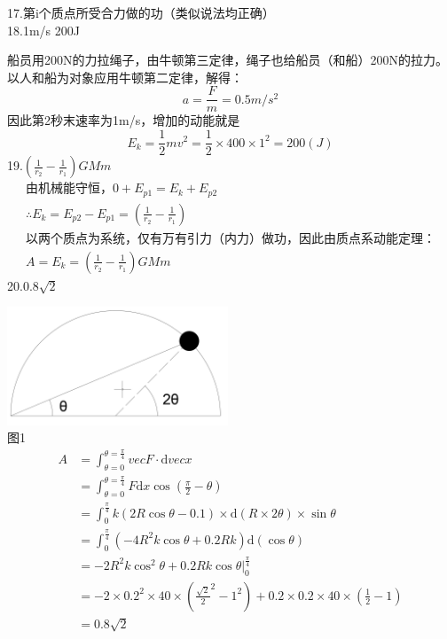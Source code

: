 \documentclass[b5paper,opensource]{./template/qyxf-book}
\newcommand{\di}[1]{\mathrm{d}#1}
\begin{document}
17.第i个质点所受合力做的功（类似说法均正确）\\
18.1m/s \qquad 200J\par
船员用200N的力拉绳子，由牛顿第三定律，绳子也给船员（和船）200N的拉力。以人和船为对象应用牛顿第二定律，解得：
\[a=\frac{F}{m}=0.5m/s^2\]
因此第2秒末速率为1m/s，增加的动能就是
\[E_k=\frac{1}{2}mv^2=\frac{1}{2}\times400\times1^2=200(J)\]
19.$\left(\frac{1}{r_2}-\frac{1}{r_1}\right)GMm$ 
\begin{gather*}
\text{由机械能守恒，}0+E_{p1}=E_k+E_{p2}\\
\therefore E_k=E_{p2}-E_{p1}=\left(\frac{1}{r_2}-\frac{1}{r_1}\right)\\
\text{以两个质点为系统，仅有万有引力（内力）做功，因此由质点系动能定理：}\\
A=E_k=\left(\frac{1}{r_2}-\frac{1}{r_1}\right)GMm
\end{gather*}
20.$0.8\sqrt{2}$\par
\centering\includegraphics[height=100pt]{Chp2_illus1.png}\\
图1
\begin{align*}
A	&=\int_{\theta=0}^{\theta=\frac{\pi}{4}}{vec{F}}\cdot\di{vec{x}}\\
&=\int_{\theta=0}^{\theta=\frac{\pi}{4}}F\di{x}\cos\left(\frac{\pi}{2}-\theta\right)\\
&=\int_{0}^{\frac{\pi}{4}}k(2R\cos\theta-0.1)\times\di{(R\times 2\theta)}\times\sin\theta\\
&=\int_{0}^{\frac{\pi}{4}}(-4R^2k\cos\theta+0.2Rk)\di{(\cos\theta)}\\
&=-2R^2k\cos^2\theta+0.2Rk\cos\theta\left.\right|_0^{\frac{\pi}{4}}\\
&=-2\times 0.2^2\times 40\times({\frac{\sqrt{2}}{2}}^2-1^2)+0.2\times 0.2\times 40\times(\frac{1}{2}-1)\\
&=0.8\sqrt{2}
\end{align*}
\raggedright
\end{document}
